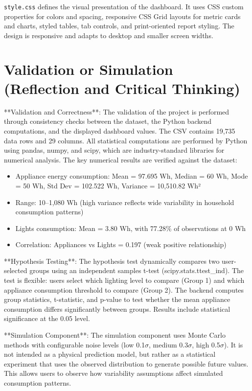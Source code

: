 \documentclass[12pt,a4paper]{article}
\begin{document}
\texttt{style.css} defines the visual presentation of the dashboard. It uses CSS custom properties for colors and spacing, responsive CSS Grid layouts for metric cards and charts, styled tables, tab controls, and print-oriented report styling. The design is responsive and adapts to desktop and smaller screen widths.


\section{Validation or Simulation (Reflection and
Critical Thinking)}
\label{sec:simulation}

**Validation and Correctness**:
The validation of the project is performed through consistency checks between the dataset, the Python backend computations, and the displayed dashboard values. The CSV contains 19,735 data rows and 29 columns. All statistical computations are performed by Python using pandas, numpy, and scipy, which are industry-standard libraries for numerical analysis. The key numerical results are verified against the dataset:

\begin{itemize}
  \item Appliance energy consumption: Mean = 97.695 Wh, Median = 60 Wh, Mode = 50 Wh, Std Dev = 102.522 Wh, Variance = 10,510.82 Wh²
  \item Range: 10–1,080 Wh (high variance reflects wide variability in household consumption patterns)
  \item Lights consumption: Mean = 3.80 Wh, with 77.28\% of observations at 0 Wh
  \item Correlation: Appliances vs Lights = 0.197 (weak positive relationship)
\end{itemize}

**Hypothesis Testing**:
The hypothesis test dynamically compares two user-selected groups using an independent samples t-test (scipy.stats.ttest\_ind). The test is flexible: users select which lighting level to compare (Group 1) and which appliance consumption threshold to compare (Group 2). The backend computes group statistics, t-statistic, and p-value to test whether the mean appliance consumption differs significantly between groups. Results include statistical significance at the 0.05 level.

**Simulation Component**:
The simulation component uses Monte Carlo methods with configurable noise levels (low 0.1$\sigma$, medium 0.3$\sigma$, high 0.5$\sigma$). It is not intended as a physical prediction model, but rather as a statistical experiment that uses the observed distribution to generate possible future values. This allows users to observe how variability assumptions affect simulated consumption patterns.
\end{document}
